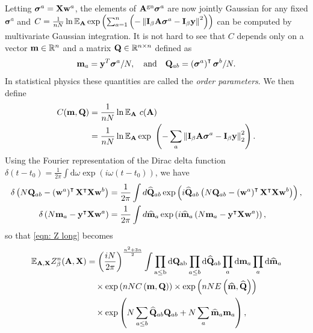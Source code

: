 \documentclass[9pt,twocolumn]{pnas-new}
\begin{document}
Letting $\boldsymbol{\sigma}^a=\mathbf{X}\mathbf{w}^a$, the elements of  $\mathbf{A}^{\text{gn}}\boldsymbol{\sigma}^a$ are now jointly Gaussian for any fixed $\boldsymbol{\sigma}^a$ and $C=\frac{1}{nN}\ln\mathbb{E}_{\mathbf{A}}\exp\left(\sum_{a=1}^n\left(-\left\lVert\mathbf{I}_\beta \mathbf{A}\boldsymbol{\sigma}^a-\mathbf{I}_\beta \mathbf{y}\right\rVert^2\right)\right)$ can be computed by multivariate Gaussian integration. It is not hard to see that $C$ depends only on a vector $\mathbf{m}\in\mathbb{R}^{n}$ and a matrix $\mathbf{Q} \in \mathbb{R}^{n\times n}$ defined as
\begin{equation}\label{eqn: order parameter}
    \mathbf{m}_a=\mathbf{y}^T \boldsymbol{\sigma}^a/N, \quad \text{and} \quad \mathbf{Q}_{ab}=\left(\boldsymbol{\sigma}^a\right)^\intercal \boldsymbol{\sigma}^b/N.
\end{equation}
In statistical physics these quantities are called the \emph{order parameters}. We then define
\begin{equation}\label{eqn:replica-separated-C}
\begin{aligned}
    C(\mathbf{m},\mathbf{Q}) &=\frac{1}{nN}\ln\mathbb{E}_{\mathbf{A}} ~c(\mathbf{A}) \\
    &=\frac{1}{nN} \ln\mathbb{E}_{\mathbf{A}}\exp ~\left(-\sum_{a}\left\|\mathbf{I}_{\beta} \mathbf{A} \boldsymbol{\sigma}^{a}-\mathbf{I}_{\beta} \mathbf{y}\right\|_{2}^{2}\right).
\end{aligned}
\end{equation}
Using the Fourier representation of the Dirac delta function $\delta(t-t_0)=\frac{1}{2\pi}\int \mathrm{d}\omega \exp(i\omega(t-t_0))$, we have
\begin{equation}\label{eq:fourier-rep}
    \begin{aligned}
    \delta\left(N\mathbf{Q}_{ab}-\left(\mathbf{w}^{a}\right)^\intercal \mathbf{X}^{\intercal}\mathbf{X}\mathbf{w}^{b}\right)&=\frac{1}{2\pi}\int d\widehat{\mathbf{Q}}_{ab}\exp\left(i\widehat{\mathbf{Q}}_{ab}\left(N\mathbf{Q}_{ab}-\left(\mathbf{w}^{a}\right)^{\intercal}\mathbf{X}^{\intercal}\mathbf{X}\mathbf{w}^{b}\right)\right),\\\delta\left(N\mathbf{m}_{a}-\mathbf{y}^{\intercal}\mathbf{X}\mathbf{w}^{a}\right)&=\frac{1}{2\pi}\int d\widehat{\mathbf{m}}_{a}\exp\left(i\widehat{\mathbf{m}}_{a}\left(N\mathbf{m}_{a}-\mathbf{y}^{\intercal}\mathbf{X}\mathbf{w}^{a}\right)\right),
    \end{aligned}
\end{equation}
so that \eqref{eqn: Z long} becomes
\begin{equation}\label{eqn: Z C E}
\begin{aligned}
\mathbb{E}_{\mathbf{A},\mathbf{X}}Z_\beta^{n}(\mathbf{A},\mathbf{X}) & =\left(\frac{iN}{2\pi}\right)^{\frac{n^{2}+3 n}{2}}\int\mathrm{\prod_{a\leq b}\mathrm{d}\mathbf{Q}_{ab}}\prod_{a\leq b}\mathrm{d}\widehat{\mathbf{Q}}_{ab}\prod_{a}\mathrm{d}\mathbf{m}_{a}\prod_{a}\mathrm{d}\widehat{\mathbf{m}}_{a}\\&\quad\times\exp\left(nN C\left(\mathbf{m},\mathbf{Q}\right)\right) \times \exp\left(nN E\left(\widehat{\mathbf{m}},\widehat{\mathbf{Q}}\right)\right)\\&\quad\times \exp\left(N\sum_{a\leq b}\widehat{\mathbf{Q}}_{ab}\mathbf{Q}_{ab}+N\sum_{a}\widehat{\mathbf{m}}_{a}\mathbf{m}_{a}\right),
\end{aligned}
\end{equation}
\end{document}
